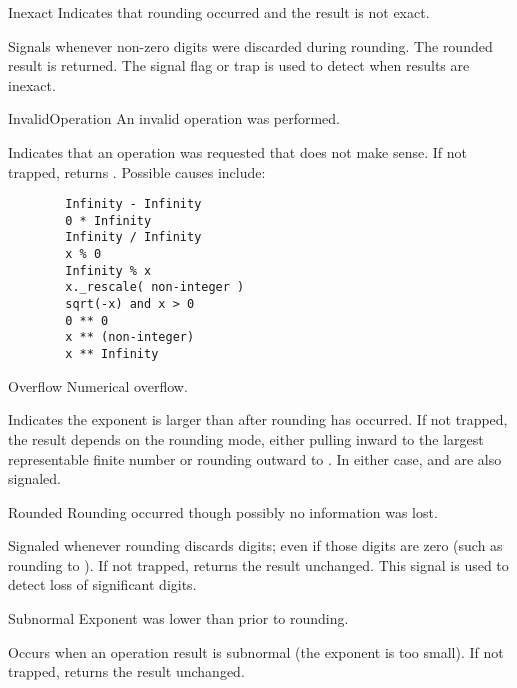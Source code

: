 \begin{classdesc*}{Inexact}
    Indicates that rounding occurred and the result is not exact.

    Signals whenever non-zero digits were discarded during rounding.
    The rounded result is returned.  The signal flag or trap is used
    to detect when results are inexact.
\end{classdesc*}

\begin{classdesc*}{InvalidOperation}
    An invalid operation was performed.

    Indicates that an operation was requested that does not make sense.
    If not trapped, returns .  Possible causes include:

    \begin{verbatim}
        Infinity - Infinity
        0 * Infinity
        Infinity / Infinity
        x % 0
        Infinity % x
        x._rescale( non-integer )
        sqrt(-x) and x > 0
        0 ** 0
        x ** (non-integer)
        x ** Infinity      
    \end{verbatim}    
\end{classdesc*}

\begin{classdesc*}{Overflow}
    Numerical overflow.

    Indicates the exponent is larger than  after rounding has
    occurred.  If not trapped, the result depends on the rounding mode, either
    pulling inward to the largest representable finite number or rounding
    outward to .  In either case,  and
     are also signaled.   
\end{classdesc*}

\begin{classdesc*}{Rounded}
    Rounding occurred though possibly no information was lost.

    Signaled whenever rounding discards digits; even if those digits are
    zero (such as rounding  to ).   If not
    trapped, returns the result unchanged.  This signal is used to detect
    loss of significant digits.
\end{classdesc*}

\begin{classdesc*}{Subnormal}
    Exponent was lower than  prior to rounding.
          
    Occurs when an operation result is subnormal (the exponent is too small).
    If not trapped, returns the result unchanged.
\end{classdesc*}

